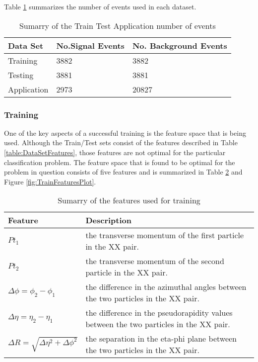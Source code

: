 Table \ref{table:TrainTestApp} summarizes the number of events used in each dataset.

\begin{table}[h!]
\centering
\begin{tabular}{ |p{3cm}|p{3cm}|p{4cm}|  }
 \hline
Data Set & No.Signal Events & No. Background Events \\
 \hline
Training & 3882 & 3882 \\
Testing & 3881 & 3881 \\
Application & 2973 & 20827 \\
 \hline
\end{tabular}
\caption{Sumarry of the Train Test Application number of events}
\label{table:TrainTestApp}
\end{table}
\subsubsection{Training}
\label{sec:orgf9d881c}
One of the key aspects of a successful training is the feature space that is being used. Although the Train/Test sets consist of the features described in Table \ref{table:DataSetFeatures}, those features are not optimal for the particular classification problem. The feature space that is found to be optimal for the problem in question consists of five features and is summarized in Table \ref{table:TrainFeatures} and Figure \ref{fig:TrainFeaturesPlot}.

\begin{table}[h!]
\centering
\begin{tabular}{ |p{3.5cm}|p{11cm}| }
 \hline
Feature & Description \\
 \hline
$Pt_{1}$ &  the transverse momentum of the first particle in the XX pair. \\
 \hline
$Pt_{2}$ &the transverse momentum of the second particle in the XX pair. \\
 \hline
$\Delta\phi = \phi_{2} - \phi_{1}$ & the difference in the azimuthal angles between the two particles in the XX pair. \\
 \hline
$\Delta\eta = \eta_{2} - \eta_{1}$ & the difference in the pseudorapidity values between the two particles in the XX pair. \\
 \hline
$\Delta R = \sqrt{\Delta\eta^{2} + \Delta\phi^{2}}$ & the separation in the eta-phi plane between the two particles in the XX pair. \\
 \hline
\end{tabular}
\caption{Sumarry of the features used for training }
\label{table:TrainFeatures}
\end{table}

